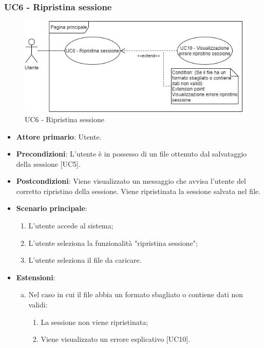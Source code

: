 \subsubsection{UC6 - Ripristina sessione}
\begin{figure}[h]
\includegraphics[width=\linewidth]{section/Images/UC6.png}
\centering
\caption{UC6 - Ripristina sessione}
\end{figure}
\begin{itemize}
	\item \textbf{Attore primario}: Utente.
	\item \textbf{Precondizioni}: L'utente è in possesso di un file  ottenuto dal salvataggio della sessione [UC5].
	\item \textbf{Postcondizioni}: Viene visualizzato un messaggio che avvisa l'utente del corretto ripristino della sessione. Viene ripristinata la sessione salvata nel file.
	\item \textbf{Scenario principale}:
		\begin{enumerate}
			\item L'utente accede al sistema;
			\item L'utente seleziona la funzionalità "ripristina sessione";
			\item L'utente seleziona il file da caricare.
		\end{enumerate}
	\item \textbf{Estensioni}:
	\begin{enumerate}[(a)]
		\item Nel caso in cui il file abbia un formato sbagliato o contiene dati non validi:
		\begin{enumerate}[1.]
			\item La sessione non viene ripristinata;
			\item Viene visualizzato un errore esplicativo [UC10].
		\end{enumerate}
	\end{enumerate}
\end{itemize}